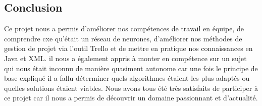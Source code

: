 \documentclass[12pt]{article}
\begin{document}
\subsection{Conclusion}
Ce projet nous a permis d'améliorer nos compétences de travail en équipe, de comprendre cxe qu'était un réseau de neurones, d'améliorer nos méthodes de gestion de projet via l'outil Trello et de mettre en pratique nos connaissances en Java et XML. il nous a également appris à monter en compétence sur un sujet qui nous était inconnu de manière quasiment autonome car une fois le principe de base expliqué il a fallu déterminer quels algorithmes étaient les plus adaptés ou quelles solutions étaient viables.
Nous avons tous été très satisfaits de participer à ce projet car il nous a permis de découvrir un domaine passionnant et d'actualité.
\end{document}
